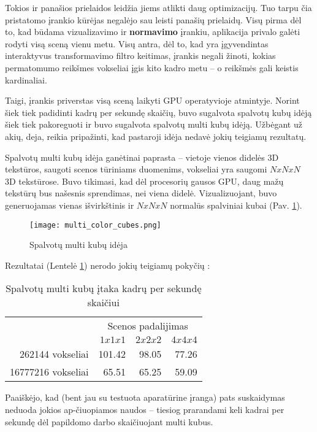 Tokios ir panašios prielaidos leidžia jiems atlikti daug optimizacijų.  Tuo
tarpu čia pristatomo įrankio kūrėjas negalėjo sau leisti panašių prielaidų.
Visų pirma dėl to, kad būdama vizualizavimo ir {\bf normavimo} įrankiu,
aplikacija privalo galėti rodyti visą sceną vienu metu. Visų antra, dėl to,
kad yra įgyvendintas interaktyvus transformavimo filtro keitimas, įrankis
negali žinoti, kokias permatomumo reikšmes vokseliai įgis kito kadro metu -- o
reikšmės gali keistis kardinaliai.

Taigi, įrankis priverstas visą sceną laikyti GPU operatyvioje atmintyje.
Norint šiek tiek padidinti kadrų per sekundę skaičių, buvo sugalvota spalvotų
kubų idėją šiek tiek pakoreguoti ir buvo sugalvota spalvotų multi kubų idėją.
Užbėgant už akių, deja, reikia pripažinti, kad pastaroji idėja nedavė jokių
teigiamų rezultatų.

Spalvotų multi kubų idėja ganėtinai paprasta -- vietoje vienos didelės 3D
tekstūros, saugoti scenos tūriniams duomenims, vokseliai yra saugomi $NxNxN$
3D tekstūrose. Buvo tikimasi, kad dėl procesorių gausos GPU, daug mažų
tekstūrų bus našesnis sprendimas, nei viena didelė. Vizualizuojant, buvo
generuojamas vienas išvirkštinis ir $NxNxN$ normalūs spalviniai kubai (Pav.
\ref{fig:multi_color_cubes}).

\begin{figure}[!ht]
\centering
\texttt{[image: multi\_color\_cubes.png]}
\caption{Spalvotų multi kubų idėja}
\label{fig:multi_color_cubes}
\end{figure}

Rezultatai (Lentelė \ref{tab:multi_color_cubes}) nerodo jokių teigiamų pokyčių
:

\begin{table}[!ht]
\centering
  \begin{tabular}{ | r | r | r | r | }
  \cline{2-4}
  \multicolumn{1}{c|}{} & \multicolumn{3}{|c|}{Scenos padalijimas} \\ \cline{2-4}
  \multicolumn{1}{c|}{} & $1x1x1$ & $2x2x2$ & $4x4x4$ \\ \hline
  262144 vokseliai      &  101.42 &   98.05 &   77.26 \\ \hline
  16777216 vokseliai    &   65.51 &   65.25 &   59.09 \\ \hline
  \end{tabular}
\caption{Spalvotų multi kubų įtaka kadrų per sekundę skaičiui}
\label{tab:multi_color_cubes}
\end{table}

Paaiškėjo, kad (bent jau su testuota aparatūrine įranga) pats suskaidymas neduoda
jokios ap-čiuopiamos naudos -- tiesiog prarandami keli kadrai per sekundę dėl
papildomo darbo skaičiuojant multi kubus.


